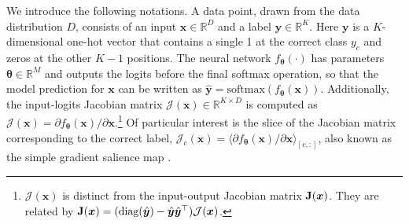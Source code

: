 We introduce the following notations. A data point, drawn from the data distribution $D$, consists of an input $\bm x \in \mathbb{R}^D$ and a label $\bm y \in \mathbb{R}^K$. Here $\bm y$ is a $K$-dimensional one-hot vector that contains a single 1 at the correct class $y_c$ and zeros at the other $K-1$ positions. The neural network $f_{\bm \theta}(\cdot)$ has parameters $\bm \theta \in \mathbb{R}^M$ and outputs the logits before the final softmax operation, so that the model prediction for $\bm{x}$ can be written as $\hat{\bm y} = \text{softmax}(f_{\bm \theta}(\bm x))$.
Additionally, the input-logits Jacobian matrix $\mathcal{J}(\bm x) \in \mathbb{R}^{K\times D}$ is computed as $\mathcal{J}(\bm x) = \partial f_{\bm \theta}(\bm x) / \partial \bm x$.\footnote{ $\mathcal{J}(\bm x)$ is distinct from the input-output Jacobian matrix $\bm{\mathrm{J}}(\bm x)$. They are related by $\bm{\mathrm{J}}(\bm x) = (\text{diag}({\hat{\bm y}})-{\hat{\bm y}}{\hat{\bm y}}^\top)\mathcal{J}(\bm x)$.} Of particular interest is the slice of the Jacobian matrix corresponding to the correct label, $\mathcal{J}_{c}(\bm x) = \langle \partial f_{\bm \theta}(\bm x)/ \partial \bm x\rangle_{[c,:]} $, also known as the simple gradient salience map \cite{simple_gradient}.

